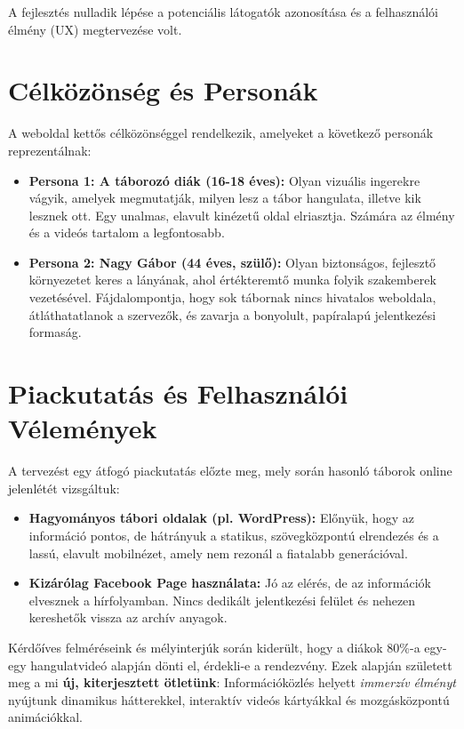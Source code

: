 \documentclass[12pt, a4paper]{report}
\begin{document}
A fejlesztés nulladik lépése a potenciális látogatók azonosítása és a felhasználói élmény (UX) megtervezése volt.

\section{Célközönség és Personák}
A weboldal kettős célközönséggel rendelkezik, amelyeket a következő personák reprezentálnak:

\begin{itemize}
    \item \textbf{Persona 1: A táborozó diák (16-18 éves):} Olyan vizuális ingerekre vágyik, amelyek megmutatják, milyen lesz a tábor hangulata, illetve kik lesznek ott. Egy unalmas, elavult kinézetű oldal elriasztja. Számára az élmény és a videós tartalom a legfontosabb.
    \item \textbf{Persona 2: Nagy Gábor (44 éves, szülő):} Olyan biztonságos, fejlesztő környezetet keres a lányának, ahol értékteremtő munka folyik szakemberek vezetésével. Fájdalompontja, hogy sok tábornak nincs hivatalos weboldala, átláthatatlanok a szervezők, és zavarja a bonyolult, papíralapú jelentkezési formaság.
\end{itemize}

\section{Piackutatás és Felhasználói Vélemények}
A tervezést egy átfogó piackutatás előzte meg, mely során hasonló táborok online jelenlétét vizsgáltuk:
\begin{itemize}
    \item \textbf{Hagyományos tábori oldalak (pl. WordPress):} Előnyük, hogy az információ pontos, de hátrányuk a statikus, szövegközpontú elrendezés és a lassú, elavult mobilnézet, amely nem rezonál a fiatalabb generációval.
    \item \textbf{Kizárólag Facebook Page használata:} Jó az elérés, de az információk elvesznek a hírfolyamban. Nincs dedikált jelentkezési felület és nehezen kereshetők vissza az archív anyagok.
\end{itemize}

Kérdőíves felméréseink és mélyinterjúk során kiderült, hogy a diákok 80\%-a egy-egy hangulatvideó alapján dönti el, érdekli-e a rendezvény. Ezek alapján született meg a mi \textbf{új, kiterjesztett ötletünk}: Információközlés helyett \textit{immerzív élményt} nyújtunk dinamikus hátterekkel, interaktív videós kártyákkal és mozgásközpontú animációkkal.
\end{document}
